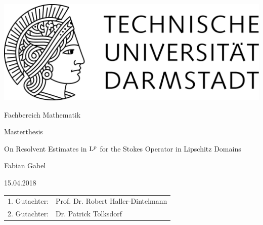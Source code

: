 \begin{titlepage}
  \begin{center}
    \includegraphics[width=0.5\linewidth]{TU_Darmstadt_Logo.pdf}
    \vfill
    
    \large{Fachbereich Mathematik}
    \vfill
    
    \large{Masterthesis}
    \vfill

    \huge{On Resolvent Estimates in $\mathrm{L}^p$ for the Stokes Operator in Lipschitz Domains}
    \vfill
    
		\large
    Fabian Gabel

    \large 15.04.2018
    \vfill
\begin{tabular}{rl}
    1. Gutachter:& Prof. Dr. Robert Haller-Dintelmann
    \\
    2. Gutachter:& Dr. Patrick Tolksdorf
\end{tabular}
  \end{center}
\end{titlepage}

